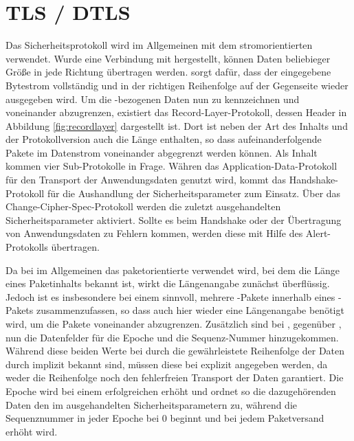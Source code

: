 \chapter{TLS / DTLS}
\label{chp:dtls}


Das Sicherheitsprotokoll  \cite{rfc5246} wird im Allgemeinen mit dem stromorientierten  verwendet.
Wurde eine Verbindung mit  hergestellt, können Daten beliebieger Größe in jede Richtung
übertragen werden.  sorgt dafür, dass der eingegebene Bytestrom vollständig und in der
richtigen Reihenfolge auf der Gegenseite wieder ausgegeben wird. Um die -bezogenen Daten nun
zu kennzeichnen und voneinander abzugrenzen, existiert das Record-Layer-Protokoll, dessen Header in Abbildung \ref{fig:recordlayer}
dargestellt ist. Dort ist neben der Art des Inhalts und der Protokollversion auch die Länge enthalten, so dass
aufeinanderfolgende Pakete im Datenstrom voneinander abgegrenzt werden können. Als Inhalt kommen vier Sub-Protokolle
in Frage. Währen das Application-Data-Protokoll für den Transport der Anwendungsdaten genutzt wird, kommt
das Handshake-Protokoll für die Aushandlung der Sicherheitsparameter zum Einsatz. Über das Change-Cipher-Spec-Protokoll
werden die zuletzt ausgehandelten Sicherheitsparameter aktiviert. Sollte es beim Handshake oder der Übertragung
von Anwendungsdaten zu Fehlern kommen, werden diese mit Hilfe des Alert-Protokolls übertragen.

Da bei  \cite{rfc6347} im Allgemeinen das paketorientierte  verwendet wird, bei dem die Länge eines
Paketinhalts bekannt ist, wirkt die Längenangabe zunächst überflüssig. Jedoch ist es insbesondere bei einem
 sinnvoll, mehrere -Pakete innerhalb eines -Pakets zusammenzufassen,
so dass auch hier wieder eine Längenangabe benötigt wird, um die Pakete voneinander abzugrenzen.
Zusätzlich sind bei , gegenüber , nun die Datenfelder für die Epoche und die Sequenz-Nummer hinzugekommen.
Während diese beiden Werte bei  durch die gewährleistete Reihenfolge der Daten durch 
implizit bekannt sind, müssen diese bei  explizit angegeben werden, da  weder die
Reihenfolge noch den fehlerfreien Transport der Daten garantiert. Die Epoche wird bei einem erfolgreichen 
erhöht und ordnet so die dazugehörenden Daten den im  ausgehandelten Sicherheitsparametern zu,
während die Sequenznummer in jeder Epoche bei $ 0 $ beginnt und bei jedem Paketversand erhöht wird.

